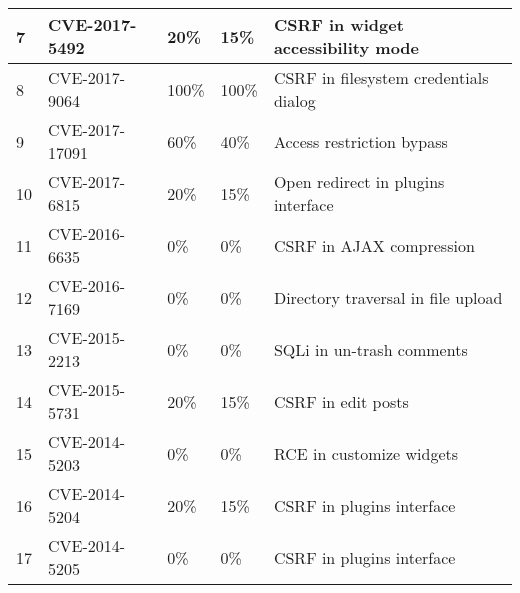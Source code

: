 \begin{table}[]
\begin{adjustbox}{max width=0.65\textwidth}
\begin{tabular}{|lllll|}
    \multicolumn{1}{|l|}{7}           & \multicolumn{1}{l|}{CVE-2017-5492}    & \multicolumn{1}{l|}{20\%}                 & \multicolumn{1}{l|}{15\%}              & CSRF in widget accessibility mode       \\ \hline
    \multicolumn{1}{|l|}{8}           & \multicolumn{1}{l|}{CVE-2017-9064}    & \multicolumn{1}{l|}{100\%}                & \multicolumn{1}{l|}{100\%}             & CSRF in filesystem credentials dialog   \\ \hline
    \multicolumn{1}{|l|}{9}           & \multicolumn{1}{l|}{CVE-2017-17091}   & \multicolumn{1}{l|}{60\%}                 & \multicolumn{1}{l|}{40\%}              & Access restriction bypass               \\ \hline
    \multicolumn{1}{|l|}{10}          & \multicolumn{1}{l|}{CVE-2017-6815}    & \multicolumn{1}{l|}{20\%}                 & \multicolumn{1}{l|}{15\%}              & Open redirect in plugins interface      \\ \hline
    \multicolumn{1}{|l|}{11}          & \multicolumn{1}{l|}{CVE-2016-6635}    & \multicolumn{1}{l|}{0\%}                  & \multicolumn{1}{l|}{0\%}               & CSRF in AJAX compression                \\ \hline
    \multicolumn{1}{|l|}{12}          & \multicolumn{1}{l|}{CVE-2016-7169}    & \multicolumn{1}{l|}{0\%}                  & \multicolumn{1}{l|}{0\%}               & Directory traversal in file upload      \\ \hline
    \multicolumn{1}{|l|}{13}          & \multicolumn{1}{l|}{CVE-2015-2213}    & \multicolumn{1}{l|}{0\%}                  & \multicolumn{1}{l|}{0\%}               & SQLi in un-trash comments               \\ \hline
    \multicolumn{1}{|l|}{14}          & \multicolumn{1}{l|}{CVE-2015-5731}    & \multicolumn{1}{l|}{20\%}                 & \multicolumn{1}{l|}{15\%}              & CSRF in edit posts                      \\ \hline
    \multicolumn{1}{|l|}{15}          & \multicolumn{1}{l|}{CVE-2014-5203}    & \multicolumn{1}{l|}{0\%}                  & \multicolumn{1}{l|}{0\%}               & RCE in customize widgets                \\ \hline
    \multicolumn{1}{|l|}{16}          & \multicolumn{1}{l|}{CVE-2014-5204}    & \multicolumn{1}{l|}{20\%}                 & \multicolumn{1}{l|}{15\%}              & CSRF in plugins interface               \\ \hline
    \multicolumn{1}{|l|}{17}          & \multicolumn{1}{l|}{CVE-2014-5205}    & \multicolumn{1}{l|}{0\%}                  & \multicolumn{1}{l|}{0\%}               & CSRF in plugins interface               \\ \hline

\end{tabular}
\end{adjustbox}
\end{table}
